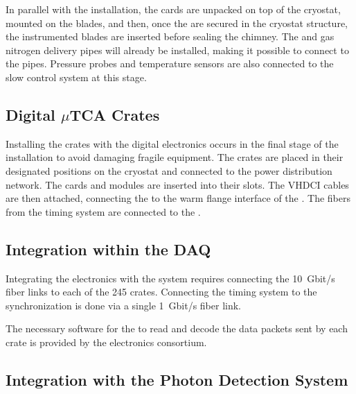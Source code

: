 In parallel with the  installation, the  cards are unpacked on top of the cryostat, %
mounted on the blades, and then, %
once the  are secured in the cryostat structure, the instrumented blades %
are inserted before sealing the chimney. %
The  and gas nitrogen delivery pipes will %
already be installed, making it  possible to connect to the pipes. Pressure probes and temperature sensors are also connected to the slow control system at this stage.

\subsection{Digital $\mu$TCA Crates}
\label{ssec:dp-tpcelec-install-utca}

Installing the  crates with the digital electronics occurs in the final stage of the  installation to avoid damaging fragile equipment. The crates are placed in their designated positions on the cryostat and connected to the power distribution network. The  cards and  modules are inserted into their slots. The VHDCI cables are then attached, connecting the   to the warm flange interface of the .  The fibers from the timing system are connected to the . 

\subsection{Integration within the DAQ}
\label{ssec:dp-tpcelec-install-daq}

Integrating the   electronics with the  system requires connecting the \SI{10}{Gbit/s} fiber links to each of the \num{245}  crates. Connecting the timing system to the synchronization  is done via a single \SI{1}{Gbit/s} fiber link. 

The necessary software for the  to read and decode the data packets sent by each  crate is provided by the electronics consortium.  

\subsection{Integration with the Photon Detection System}
\label{ssec:dp-tpcelec-install-pmt}

